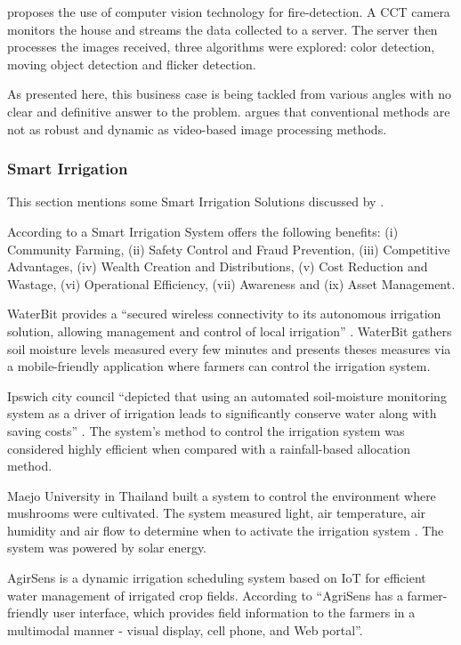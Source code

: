\cite{mohammed2021computer} proposes the use of computer vision technology for fire-detection. A \gls{CCT} camera monitors the house and streams the data collected to a server. The server then processes the images received, three algorithms were explored: color detection, moving object detection and flicker detection.

As presented here, this business case is being tackled from various angles with no clear and definitive answer to the problem. \cite{article-fire} argues that conventional methods are not as robust and dynamic as video-based image processing methods.

\subsubsection{Smart Irrigation}
\label{subsubsec:stateofart:arch:solutions:irrigation}

This section mentions some Smart Irrigation Solutions discussed by \cite{OBAIDEEN2022100124}.

According to \cite{8372905} a Smart Irrigation System offers the following benefits: (i) Community Farming, (ii) Safety Control and Fraud Prevention, (iii) Competitive Advantages, (iv) Wealth Creation and Distributions, (v) Cost Reduction and Wastage, (vi) Operational Efficiency, (vii) Awareness and (ix) Asset Management.

WaterBit provides a ``secured wireless connectivity to its autonomous irrigation solution, allowing management and control of local irrigation'' \parencite{OBAIDEEN2022100124}. WaterBit gathers soil moisture levels measured every few minutes and presents theses measures via a mobile-friendly application where farmers can control the irrigation system.

Ipswich city council ``depicted that using an automated soil-moisture monitoring system as a driver of irrigation leads to significantly conserve water along with saving costs'' \parencite{OBAIDEEN2022100124}. The system's method to control the irrigation system was considered highly efficient when compared with a rainfall-based allocation method.

Maejo University in Thailand built a system to control the environment where mushrooms were cultivated. The system measured light, air temperature, air humidity and air flow to determine when to activate the irrigation system \parencite{OBAIDEEN2022100124}. The system was powered by solar energy.

AgirSens is a dynamic irrigation scheduling system based on IoT for efficient water management of irrigated crop fields. According to \cite{9249427} ``AgriSens has a farmer-friendly user interface, which provides field information to the farmers in a multimodal manner - visual display, cell phone, and Web portal''.

